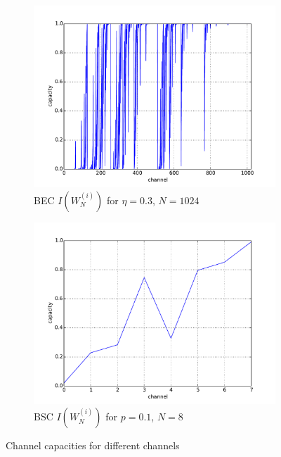 \documentclass[a4paper,12pt]{scrartcl}
\begin{document}
\begin{figure}[htb]
  \centering
  \begin{subfigure}{.49\textwidth}
  \centering
   \includegraphics[width=\textwidth]{figure/bec_capacity_0_3_1024.pdf}
   \caption{BEC $I (W^{(i)}_N )$ for $\eta=0.3$, $N=1024$}
   \label{fig:bec_capacity}
  \end{subfigure}
  \begin{subfigure}{.49\textwidth}
  \centering
   \includegraphics[width=\textwidth]{figure/bsc_capacity_0_1_8.pdf}
   \caption{BSC $I (W^{(i)}_N )$ for $p=0.1$, $N=8$}
   \label{fig:bsc_capacity}
  \end{subfigure}
  \caption{Channel capacities for different channels}
  \label{fig:capacity}
\end{figure}
\end{document}
